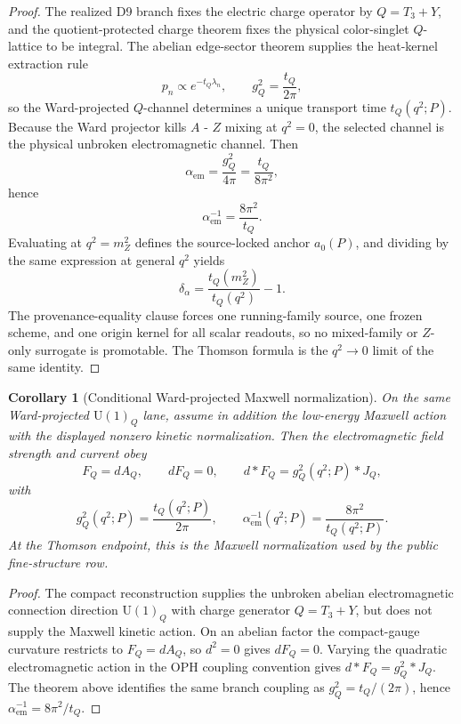 \documentclass[11pt]{article}
\newtheorem{corollary}[theorem]{Corollary}
\newcommand{\U}{\mathrm{U}}
\begin{document}
\begin{proof}
The realized D9 branch fixes the electric charge operator by \(Q=T_3+Y\), and the
quotient-protected charge theorem fixes the physical color-singlet \(Q\)-lattice to be integral.
The abelian edge-sector theorem supplies the heat-kernel extraction rule
\[
p_n\propto e^{-t_Q\lambda_n},
\qquad
g_Q^2=\frac{t_Q}{2\pi},
\]
so the Ward-projected \(Q\)-channel determines a unique transport time \(t_Q(q^2;P)\). Because
the Ward projector kills \(A\) - \(Z\) mixing at \(q^2=0\), the selected channel is the physical
unbroken electromagnetic channel. Then
\[
\alpha_{\mathrm{em}}=\frac{g_Q^2}{4\pi}=\frac{t_Q}{8\pi^2},
\]
hence
\[
\alpha_{\mathrm{em}}^{-1}=\frac{8\pi^2}{t_Q}.
\]
Evaluating at \(q^2=m_Z^2\) defines the source-locked anchor \(a_0(P)\), and dividing by the same
expression at general \(q^2\) yields
\[
\delta_\alpha=\frac{t_Q(m_Z^2)}{t_Q(q^2)}-1.
\]
The provenance-equality clause forces one running-family source, one frozen scheme, and one origin
kernel for all scalar readouts, so no mixed-family or \(Z\)-only surrogate is promotable. The
Thomson formula is the \(q^2\to0\) limit of the same identity.
\end{proof}

\begin{corollary}[Conditional Ward-projected Maxwell normalization]\label{cor:ward_maxwell_normalization}
On the same Ward-projected \(\U(1)_Q\) lane, assume in addition the low-energy Maxwell action with
the displayed nonzero kinetic normalization. Then the electromagnetic field strength and current obey
\[
F_Q=dA_Q,\qquad dF_Q=0,\qquad d{*}F_Q=g_Q^2(q^2;P){*}J_Q,
\]
with
\[
g_Q^2(q^2;P)=\frac{t_Q(q^2;P)}{2\pi},
\qquad
\alpha_{\mathrm{em}}^{-1}(q^2;P)=\frac{8\pi^2}{t_Q(q^2;P)}.
\]
At the Thomson endpoint, this is the Maxwell normalization used by the public
fine-structure row.
\end{corollary}

\begin{proof}
The compact reconstruction supplies the unbroken abelian electromagnetic connection direction
\(\U(1)_Q\) with charge generator \(Q=T_3+Y\), but does not supply the Maxwell kinetic action.
On an abelian factor the compact-gauge
curvature restricts to \(F_Q=dA_Q\), so \(d^2=0\) gives \(dF_Q=0\). Varying the quadratic
electromagnetic action in the OPH coupling convention gives \(d{*}F_Q=g_Q^2{*}J_Q\). The theorem
above identifies the same branch coupling as \(g_Q^2=t_Q/(2\pi)\), hence
\(\alpha_{\mathrm{em}}^{-1}=8\pi^2/t_Q\).
\end{proof}
\end{document}
